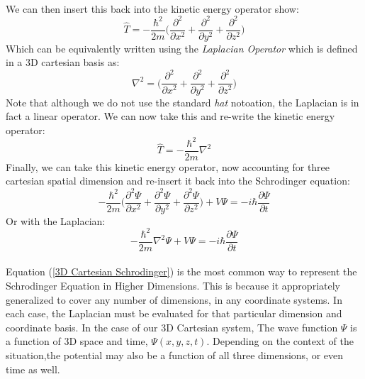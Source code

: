 \documentclass[12pt,letterpaper]{book}
\begin{document}
\paragraph*{}We can then insert this back into the kinetic energy operator show:
\begin{equation}
\hat{T} = -\frac{\hbar^2}{2m} \bigg( \frac{\partial^2}{\partial x^2} + \frac{\partial^2}{\partial y^2} + \frac{\partial^2}{\partial z^2} \bigg)
\end{equation}
Which can be equivalently written using the \textit{Laplacian Operator} which is defined in a 3D cartesian basis as:
\begin{equation}
\label{3D Cartesian Laplacian}
\nabla^2 = 
\bigg( \frac{\partial^2}{\partial x^2} + \frac{\partial^2}{\partial y^2} + \frac{\partial^2}{\partial z^2} \bigg)
\end{equation}
Note that although we do not use the standard \textit{hat} notoation, the Laplacian is in fact a linear operator. We can now take this and re-write the kinetic energy operator:
\begin{equation}
\hat{T} = -\frac{\hbar^2}{2m}\nabla^2
\end{equation}
Finally, we can take this kinetic energy operator, now accounting for three cartesian spatial dimension and re-insert it back into the Schrodinger equation:
\begin{equation}
-\frac{\hbar^2}{2m} \bigg( 
\frac{\partial^2 \Psi}{\partial x^2} + 
\frac{\partial^2 \Psi}{\partial y^2} + 
\frac{\partial^2 \Psi}{\partial z^2} \bigg) +
V\Psi = 
-i\hbar\frac{\partial \Psi}{\partial t}
\end{equation}
Or with the Laplacian:
\begin{equation}
\label{3D Schrodinger}
-\frac{\hbar^2}{2m}\nabla^2\Psi + V\Psi = 
-i\hbar\frac{\partial \Psi}{\partial t}
\end{equation}

\paragraph*{}Equation (\ref{3D Cartesian Schrodinger}) is the most common way to represent the Schrodinger Equation in Higher Dimensions. This is because it appropriately generalized to cover any number of dimensions, in any coordinate systems. In each case, the Laplacian must be evaluated for that particular dimension and coordinate basis. In the case of our 3D Cartesian system, The wave function $\Psi$ is a function of 3D space and time, $\Psi(x,y,z,t)$. Depending on the context of the situation,the potential may also be a function of all three dimensions, or even time as well. 
\end{document}
